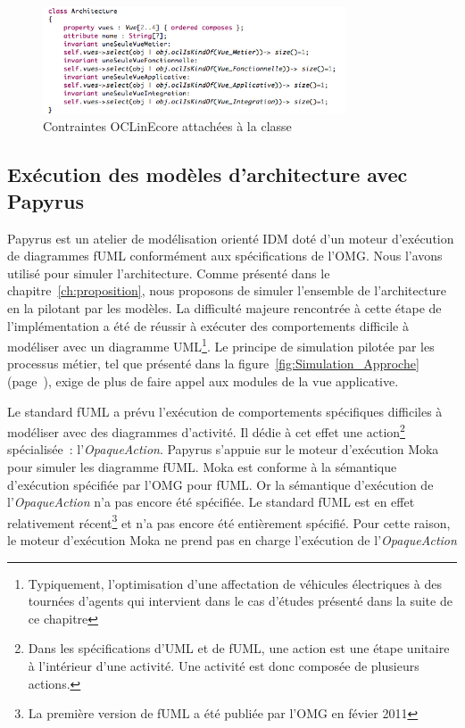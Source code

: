     \begin{figure}[!htbp]
     \begin{center}
      \includegraphics[width=0.8\textwidth]{figures/5_implementation/ocl_in_ecore_vue.png}
     \end{center}
     \caption{Contraintes OCLinEcore attachées à la classe \protect{} }
     \label{fig:contraintes_ocl_architecture}
    \end{figure}

    \subsection{Exécution des modèles d’architecture avec Papyrus}
    \label{sec:opaque_action_papyrus}

    Papyrus est un atelier de modélisation orienté IDM doté d'un moteur
    d'exécution de diagrammes fUML conformément aux spécifications de l'OMG.
    Nous l'avons utilisé pour simuler l'architecture. Comme présenté dans le
    chapitre~\ref{ch:proposition}, nous proposons de simuler l'ensemble de
    l'architecture en la pilotant par les modèles.  La difficulté majeure
    rencontrée à cette étape de l'implémentation a été de réussir à exécuter des
    comportements difficile à modéliser avec un diagramme
    UML\footnote{Typiquement, l'optimisation d'une affectation de véhicules
    électriques à des tournées d'agents qui intervient dans le cas d'études
    présenté dans la suite de ce chapitre}. Le principe de simulation pilotée
    par les processus métier, tel que présenté dans la
    figure~\ref{fig:Simulation_Approche}
    (page~\pageref{fig:Simulation_Approche}), exige de plus de faire appel aux
    modules de la vue applicative.
    
    Le standard fUML a prévu l'exécution de comportements spécifiques difficiles
    à modéliser avec  des diagrammes d'activité. Il dédie à cet effet une
    action\footnote{Dans les spécifications d'UML et de fUML, une action est une étape
    unitaire à l'intérieur d'une activité. Une activité est donc composée de
    plusieurs actions.} spécialisée~: l'\emph{OpaqueAction}. Papyrus s'appuie
    sur le moteur d'exécution Moka pour simuler les diagramme fUML. Moka est
    conforme à la sémantique d'exécution spécifiée par l'OMG pour fUML. Or la
    sémantique d'exécution de l'\emph{OpaqueAction} n'a pas encore été
    spécifiée. Le standard fUML est en effet relativement récent\footnote{La
    première version de fUML a été publiée par l'OMG en févier 2011} et n'a pas
    encore été entièrement spécifié. Pour cette raison, le moteur d'exécution
    Moka ne prend pas en charge l'exécution de l'\emph{OpaqueAction}

